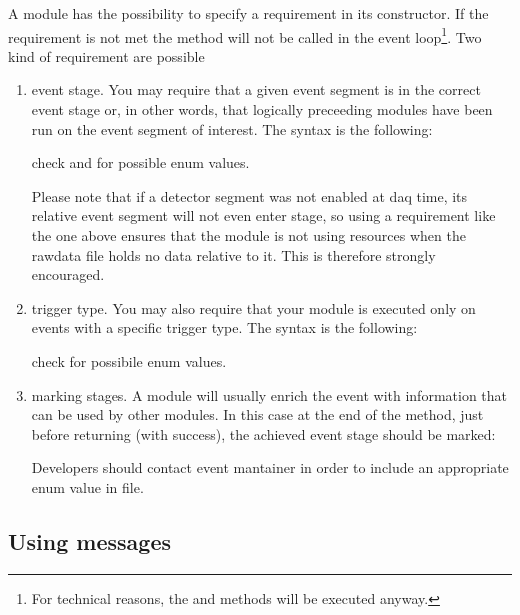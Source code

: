 A module has the possibility to specify a requirement in its constructor. 
If the requirement is not met the  method will not be called in the event loop\footnote{For technical reasons, the  and  methods will be executed anyway.}.
Two kind of requirement are possible
\begin{enumerate}
\item event stage.
  You may require that a given event segment is in the correct event stage or, in other words, that logically preceeding modules have been run on the event segment of interest.
  The syntax is the following:


  check  and  for possible enum values.

  Please note that if a detector segment was not enabled at daq time, its relative event segment will not even enter  stage, 
  so using a requirement like the one above ensures that the module is not using resources when the rawdata file holds no data relative to it. 
  This is therefore strongly encouraged. 

\item trigger type.
  You may also require that your module is executed only on events with a specific trigger type.
  The syntax is the following:  


  check  for possibile enum values.

\item marking stages.
  A module will usually enrich the event with information that can be used by other modules.
  In this case at the end of the  method, just before returning (with success), the achieved event stage should be marked:


  Developers should contact event mantainer in order to include an appropriate enum value in  file.

\end{enumerate}

\subsection{Using messages}

